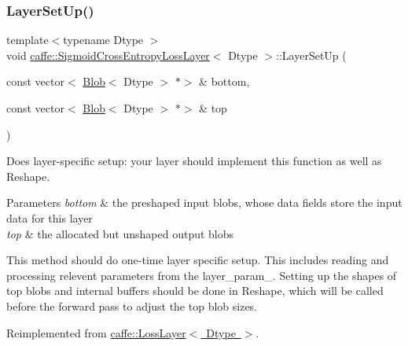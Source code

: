 \subsubsection{\texorpdfstring{Layer\+Set\+Up()}{LayerSetUp()}\hspace{0.1cm}{\footnotesize\ttfamily [2/2]}}
{\footnotesize\ttfamily template$<$typename Dtype $>$ \\
void \mbox{\hyperlink{classcaffe_1_1_sigmoid_cross_entropy_loss_layer}{caffe\+::\+Sigmoid\+Cross\+Entropy\+Loss\+Layer}}$<$ Dtype $>$\+::Layer\+Set\+Up (\begin{DoxyParamCaption}\item[{const vector$<$ \mbox{\hyperlink{classcaffe_1_1_blob}{Blob}}$<$ Dtype $>$ $\ast$$>$ \&}]{bottom,  }\item[{const vector$<$ \mbox{\hyperlink{classcaffe_1_1_blob}{Blob}}$<$ Dtype $>$ $\ast$$>$ \&}]{top }\end{DoxyParamCaption})\hspace{0.3cm}{\ttfamily [virtual]}}



Does layer-\/specific setup\+: your layer should implement this function as well as Reshape. 


\begin{DoxyParams}{Parameters}
{\em bottom} & the preshaped input blobs, whose data fields store the input data for this layer \\
\hline
{\em top} & the allocated but unshaped output blobs\\
\hline
\end{DoxyParams}
This method should do one-\/time layer specific setup. This includes reading and processing relevent parameters from the {\ttfamily layer\+\_\+param\+\_\+}. Setting up the shapes of top blobs and internal buffers should be done in {\ttfamily Reshape}, which will be called before the forward pass to adjust the top blob sizes. 

Reimplemented from \mbox{\hyperlink{classcaffe_1_1_loss_layer_aa6fc7c2e90be66f1c1f0683637c949da}{caffe\+::\+Loss\+Layer$<$ Dtype $>$}}.


